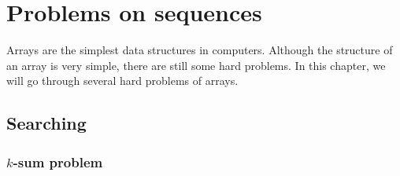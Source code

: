 \chapter{Problems on sequences}
Arrays are the simplest data structures in computers. Although the structure of an array is very simple, there are still some hard problems. In this chapter, we will go through several hard problems of arrays.

\section{Searching}

\subsection{$k$-sum problem}

